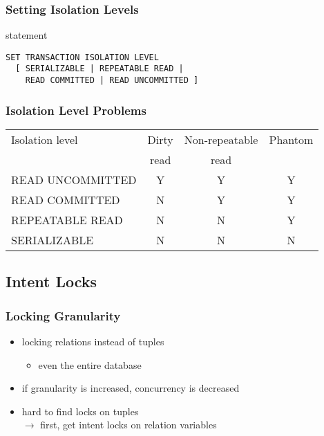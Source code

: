 \documentclass[dvipsnames]{beamer}
\theoremstyle{plain}
\begin{document}
\begin{frame}[fragile]
  \frametitle{Setting Isolation Levels}

  \begin{block}{statement}
    \begin{lstlisting}
SET TRANSACTION ISOLATION LEVEL
  [ SERIALIZABLE | REPEATABLE READ |
    READ COMMITTED | READ UNCOMMITTED ]
    \end{lstlisting}
  \end{block}
\end{frame}

\begin{frame}[fragile]
  \frametitle{Isolation Level Problems}

  \begin{table}
    \begin{tabular}{|l||c|c|c|}\hline
Isolation level  & Dirty & Non-repeatable & Phantom\\
                 & read  & read           &        \\\hline\hline
READ UNCOMMITTED & Y     & Y              & Y      \\\hline
READ COMMITTED   & N     & Y              & Y      \\\hline
REPEATABLE READ  & N     & N              & Y      \\\hline
SERIALIZABLE     & N     & N              & N      \\\hline
    \end{tabular}
  \end{table}
\end{frame}

\subsection{Intent Locks}

\begin{frame}
  \frametitle{Locking Granularity}

  \begin{itemize}
    \item locking relations instead of tuples
    \begin{itemize}
      \item even the entire database
    \end{itemize}

    \item if granularity is increased, concurrency is decreased

    \pause
    \item hard to find locks on tuples\\
      $\rightarrow$ first, get \alert{intent locks} on relation variables
  \end{itemize}
\end{frame}
\end{document}
